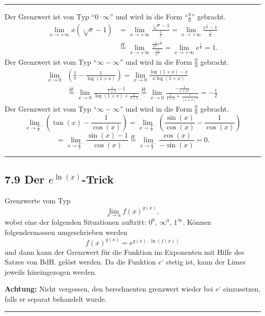 \documentclass[a4paper,landscape,8pt]{extarticle}
\newcommand{\sep}{\vspace{5pt}\noindent\hrule\vspace{5pt}}
\newcommand{\Achtung}{\textbf{Achtung: }}
\begin{document}
\begin{multicols*}{4}
\begin{warmup}
\sep

\Bsp Der Grenzwert ist von Typ ``$0\cdot\infty$'' und wird in die Form
``$\frac{0}{0}$'' gebracht.
\begin{align*}
\lim_{x\to+\infty}x(\sqrt[x]{e}-1) &=
\lim_{x\to+\infty}\frac{\sqrt[x]{e}-1}{\frac{1}{x}} =
\lim_{x\to+\infty}\frac{e^\frac{1}{x}-1}{\frac{1}{x}}\\
& \stackrel{H.}{=}
\lim_{x\to+\infty}\frac{\frac{-1}{x^2}e^{\frac{1}{x}}}{\frac{-1}{x^2}}
= \lim_{x\to+\infty} e^{\frac{1}{x}} = 1.
\end{align*}
\Bsp Der Grenzwert ist vom Typ ``$\infty - \infty$'' und wird in die Form
$\frac{0}{0}$ gebracht.
\begin{align*}
\lim_{x\to 0} &\left(\frac{1}{x} - \frac{1}{\log(1+x)}\right)
=\lim_{x\to 0} \frac{\log(1+x)-x}{x\log(1+x)}\\
&\stackrel{H.}{=}
\lim_{x\to 0} \frac{\frac{1}{1+x}-1}{\log(1+x)+\frac{x}{x+1}}
\stackrel{H.}{=}
\lim_{x\to 0} \frac{-\frac{1}{1+x^2}}{\frac{1}{1+x}+
\frac{1}{(1+x)^2}}=-\frac{1}{2}
\end{align*}
\Bsp Der Grenzwert ist vom Typ ``$\infty - \infty$'' und wird in die Form
$\frac{0}{0}$ gebracht.
\[
\lim_{x\to\frac{\pi}{2}^-} \left(\tan(x)-\frac{1}{\cos(x)}\right)
=\lim_{x\to\frac{\pi}{2}^-}
\left(\frac{\sin(x)}{\cos(x)}-\frac{1}{\cos(x)}\right)
\]
\[
=\lim_{x\to\frac{\pi}{2}^-} \frac{\sin(x)-1}{\cos(x)} \stackrel{H.}{=}
\lim_{x\to\frac{\pi}{2}^-} \frac{\cos(x)}{-\sin(x)}=0.
\]
\end{warmup}

\sep

\subsection{7.9 Der $e^{\ln(x)}$-Trick}

Grenzwerte vom Typ
\[
\lim_{x\to a} f(x)^{g(x)},
\]
wobei eine der folgenden Situationen auftritt: $0^0$, $\infty^0$, $1^\infty$.
Können folgendermassen umgeschrieben werden
\[
f(x)^{g(x)} = e^{g(x)\cdot \ln(f(x))}
\]
und dann kann der Grenzwert für die Funktion im Exponenten mit Hilfe des Satzes
von BdH. gelöst werden. Da die Funktion $e^{\square}$ stetig ist, kann der Limes
jeweils hineingezogen werden.

\Achtung Nicht vergessen, den berechnenten grenzwert wieder bei $e^{\square}$
einzusetzen, falls er separat behandelt wurde.

\begin{warmup}
\sep


\end{warmup}
\end{multicols*}
\end{document}
